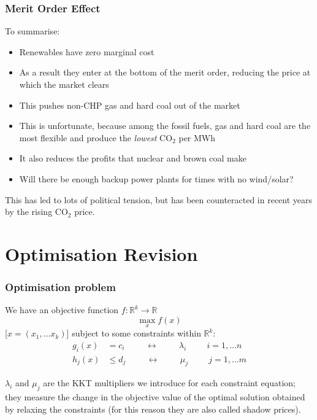 \documentclass[10pt,aspectratio=169,dvipsnames]{beamer}
\newcommand{\R}{\mathbb{R}}
\def\l{\lambda}
\def\m{\mu}
\def\co2{CO${}_2$}
\let\olditem\item
\renewcommand{\item}{%
\olditem\vspace{5pt}}
\begin{document}
\begin{frame}
  \frametitle{Merit Order Effect}

  To summarise:
  \begin{itemize}
  \item Renewables have zero marginal cost
  \item As a result they enter at the bottom of the merit order, reducing the price at which the market clears
  \item This pushes non-CHP gas and hard coal out of the market
  \item This is unfortunate, because among the fossil fuels, gas and
    hard coal are the most flexible and produce the \emph{lowest} \co2
    per MWh
  \item It also reduces the profits that nuclear and brown coal make
  \item Will there be enough backup power plants for times with no wind/solar?
  \end{itemize}

  This has led to lots of political tension, but has been counteracted in recent years by the rising CO$_2$ price.

\end{frame}


\section{Optimisation Revision}

\begin{frame}
  \frametitle{Optimisation problem}


We have an \alert{objective function} $f: \R^k \to \R$
\begin{equation*}
  \max_{x} f(x)
\end{equation*}
[$x = (x_1, \dots x_k)$] subject to some \alert{constraints} within $\R^k$:
\begin{align*}
  g_i(x) & = c_i \hspace{1cm}\leftrightarrow\hspace{1cm} \l_i \hspace{1cm} i = 1,\dots n \\
  h_j(x) & \leq d_j \hspace{1cm}\leftrightarrow\hspace{1cm} \m_j \hspace{1cm} j = 1,\dots m
\end{align*}

$\l_i$ and $\m_j$ are the \alert{KKT multipliers} we introduce for
each constraint equation; they measure the change in the objective value of the optimal solution obtained by relaxing the constraints (for this reason they are also called \alert{shadow prices}).

\end{frame}
\end{document}
